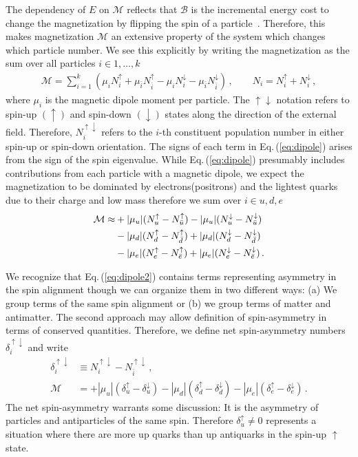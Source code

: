 \documentclass[epjST]{svjour}
\newcommand{\req}[1]{Eq.\,(\ref{#1})}
\numberwithin{equation}{section}
\begin{document}
The dependency of $E$ on $\mathcal{M}$ reflects that $\mathcal{B}$ is the incremental energy cost to change the magnetization by flipping the spin of a particle~\cite{Bali:2014kia}. Therefore, this makes magnetization $\mathcal{M}$ an extensive property of the system which changes which particle number. We see this explicitly by writing the magnetization as the sum over all particles $i\in{1,\ldots,k}$
\begin{align}
    \label{eq:dipole}
    \mathcal{M} = \sum_{i=1}^{k}(\mu_{i}N_{i}^{\uparrow} + \mu_{\bar{i}}N_{\bar{i}}^{\uparrow} - \mu_{i}N_{i}^{\downarrow} - \mu_{\bar{i}}N_{\bar{i}}^{\downarrow})\,,\qquad
    N_{i} = N_{i}^{\uparrow} + N_{i}^{\downarrow}\,,
\end{align}
where $\mu_{i}$ is the magnetic dipole moment per particle. The $\uparrow\downarrow$ notation refers to spin-up $(\uparrow)$ and spin-down $(\downarrow)$ states along the direction of the external field. Therefore, $N_{i}^{\uparrow\downarrow}$ refers to the $i$-th constituent population number in either spin-up or spin-down orientation. The signs of each term in \req{eq:dipole} arises from the sign of the spin eigenvalue. While \req{eq:dipole} presumably includes contributions from each particle with a magnetic dipole, we expect the magnetization to be dominated by electrons(positrons) and the lightest quarks due to their charge and low mass therefore we sum over $i\in{u,d,e}$
\begin{align}
    \notag\mathcal{M} \approx &+|\mu_{u}|(N_{u}^{\uparrow}-N_{\bar{u}}^{\uparrow})-|\mu_{u}|(N_{u}^{\downarrow}-N_{\bar{u}}^{\downarrow})\\
    \notag &-|\mu_{d}|(N_{d}^{\uparrow}-N_{\bar{d}}^{\uparrow})+|\mu_{d}|(N_{d}^{\downarrow}-N_{\bar{d}}^{\downarrow})\\
    \label{eq:dipole2}
    &-|\mu_{e}|(N_{e}^{\uparrow}-N_{\bar{e}}^{\uparrow})+|\mu_{e}|(N_{e}^{\downarrow}-N_{\bar{e}}^{\downarrow})\,.
\end{align}

We recognize that \req{eq:dipole2} contains terms representing asymmetry in the spin alignment though we can organize them in two different ways: (a) We group terms of the same spin alignment or (b) we group terms of matter and antimatter. The second approach may allow definition of spin-asymmetry in terms of conserved quantities. Therefore, we define net spin-asymmetry numbers $\delta_{i}^{\uparrow\downarrow}$ and write
\begin{align}
    \delta_{i}^{\uparrow\downarrow} &\equiv N_{i}^{\uparrow\downarrow}-N_{\bar{i}}^{\uparrow\downarrow}\,,\\
    \mathcal{M} &= 
    +|\mu_{u}|(\delta_{u}^{\uparrow}-\delta_{u}^{\downarrow})
    -|\mu_{d}|(\delta_{d}^{\uparrow}-\delta_{d}^{\downarrow})
    -|\mu_{e}|(\delta_{e}^{\uparrow}-\delta_{e}^{\downarrow})\,.
\end{align}
The net spin-asymmetry warrants some discussion: It is the asymmetry of particles and antiparticles of the same spin. Therefore $\delta_{u}^{\uparrow}\neq0$ represents a situation where there are more up quarks than up antiquarks in the spin-up $\uparrow$ state.
\end{document}
